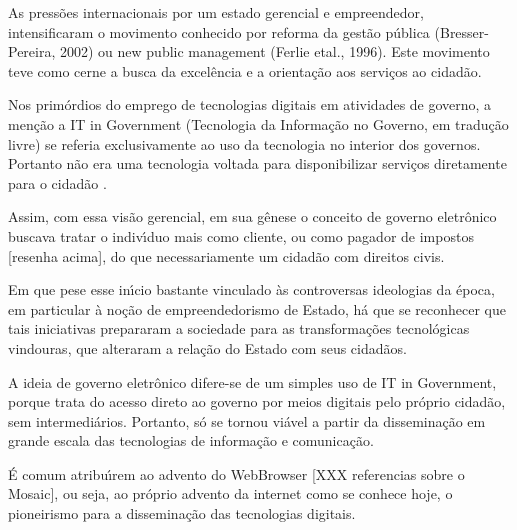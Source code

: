 \documentclass[
12pt,		%
openright,	%
twoside,  %
a4paper,			%
chapter=TITLE,		%
english,			%
french,				%
spanish,			%
brazil				%
]{USPSC-classe/USPSC_RedarTex}
\begin{document}
As press\~oes internacionais por um estado \textquotedbl gerencial e empreendedor, intensificaram o movimento conhecido por reforma da gest\~ao p\'ublica (Bresser-Pereira, 2002) ou new public management (Ferlie etal., 1996). Este movimento teve como cerne a \textquotedbl busca da excel\^encia e a orienta\c{c}\~ao aos servi\c{c}os ao cidad\~ao.








Nos prim\'ordios do emprego de tecnologias digitais em atividades de governo, a men\c{c}\~ao a \textquotedbl IT in Government (\textquotedbl Tecnologia da Informa\c{c}\~ao no Governo, em tradu\c{c}\~ao livre) se referia exclusivamente ao uso da tecnologia no interior dos governos. Portanto n\~ao era uma tecnologia voltada para disponibilizar servi\c{c}os diretamente para o cidad\~ao .








Assim, com essa vis\~ao gerencial, em sua g\^enese o conceito de governo eletr\^onico buscava tratar o indiv\'{\i}duo mais como \textquotedbl cliente, ou como \textquotedbl pagador de impostos [resenha acima], do que necessariamente um cidad\~ao com direitos civis.








Em que pese esse in\'{\i}cio bastante vinculado \`as controversas ideologias da \'epoca, em particular \`a no\c{c}\~ao de \textquotedbl empreendedorismo de Estado, h\'a que se reconhecer que tais iniciativas prepararam a sociedade para as transforma\c{c}\~oes tecnol\'ogicas vindouras, que alteraram a rela\c{c}\~ao do Estado com seus cidad\~aos.








A ideia de governo eletr\^onico difere-se de um simples uso de \textquotedbl IT in Government, porque trata do acesso direto ao governo por meios digitais pelo pr\'oprio cidad\~ao, sem intermedi\'arios. Portanto, s\'o se tornou vi\'avel a partir da dissemina\c{c}\~ao em grande escala das tecnologias de informa\c{c}\~ao e comunica\c{c}\~ao.








\'E comum atribu\'{\i}rem ao advento do WebBrowser [XXX referencias sobre o Mosaic], ou seja, ao pr\'oprio advento da internet como se conhece hoje, o pioneirismo para a dissemina\c{c}\~ao das tecnologias digitais.
\end{document}
